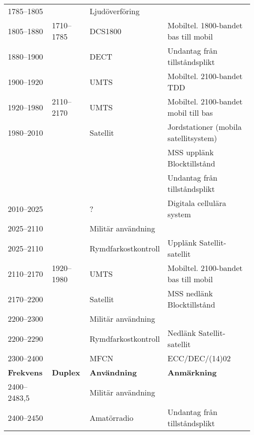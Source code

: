 \begin{landscape}
\begin{longtable}{llll}
	1785--1805         &                    & Ljudöverföring          &  \\
	1805--1880         & 1710--1785         & DCS1800                 & Mobiltel. 1800-bandet bas till mobil     \\
	1880--1900         &                    & DECT                    & Undantag från tillståndsplikt            \\
	1900--1920         &                    & UMTS                    & Mobiltel. 2100-bandet TDD                \\
	1920--1980         & 2110--2170         & UMTS                    & Mobiltel. 2100-bandet mobil till bas     \\
	1980--2010         &                    & Satellit                & Jordstationer (mobila satellitsystem)    \\
	                   &                    &                         & MSS upplänk Blocktillstånd               \\
	                   &                    &                         & Undantag från tillståndsplikt            \\
	2010--2025         &                    & ?                       & Digitala cellulära system                \\
	2025--2110         &                    & Militär användning      &  \\
	2025--2110         &                    & Rymdfarkostkontroll     & Upplänk Satellit-satellit                \\
	2110--2170         & 1920--1980         & UMTS                    & Mobiltel. 2100-bandet bas till mobil \\
	2170--2200         &                    & Satellit                & MSS nedlänk Blocktillstånd               \\
	2200--2300         &                    & Militär användning      &  \\
	2200--2290         &                    & Rymdfarkostkontroll     & Nedlänk Satellit-satellit                \\
	2300--2400         &                    & MFCN                    & ECC/DEC/(14)02                           \\
	\textbf{Frekvens}  & \textbf{Duplex}    & \textbf{Användning}     & \textbf{Anmärkning}                      \\ \hline
	2400--2483,5       &                    & Militär användning      &  \\
	2400--2450         &                    & Amatörradio             & Undantag från tillståndsplikt            \\

\end{longtable}
\end{landscape}
